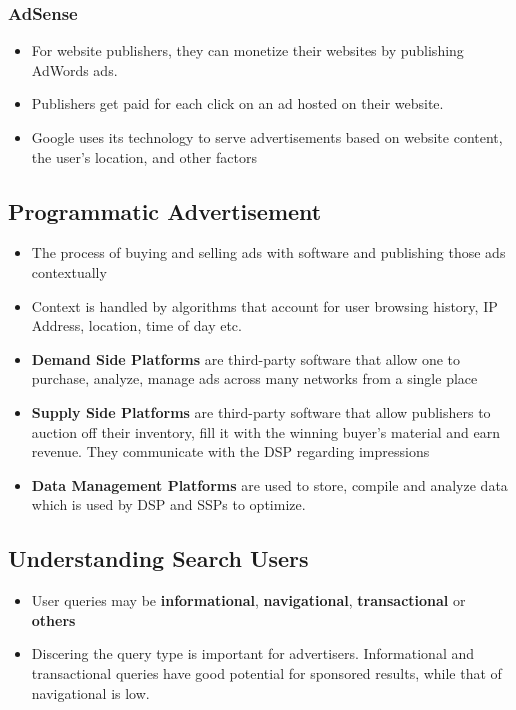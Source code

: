 \documentclass{article}
\begin{document}
\subsubsection{AdSense}
\begin{itemize}
    \item For website publishers, they can monetize their websites by publishing AdWords ads.
    
    \item Publishers get paid for each click on an ad hosted on their website.
    
    \item Google uses its technology to serve advertisements based on   website content, the user's location, and other factors
\end{itemize}

\subsection{Programmatic Advertisement}
\begin{itemize}
    \item The process of buying and selling ads with software and publishing those ads contextually
    
    \item Context is handled by algorithms that account for user browsing history, IP Address, location, time of day etc.
    
    \item \textbf{Demand Side Platforms} are third-party software that allow one to purchase, analyze, manage ads across many networks from a single place
    
    \item \textbf{Supply Side Platforms} are third-party software that allow publishers to auction off their inventory, fill it with the winning buyer's material and earn revenue. They communicate with the DSP regarding impressions
    
    \item \textbf{Data Management Platforms} are used to store, compile and analyze data which is used by DSP and SSPs to optimize. 
\end{itemize}

\subsection{Understanding Search Users}
\begin{itemize}
    \item User queries may be \textbf{informational}, \textbf{navigational}, \textbf{transactional} or \textbf{others}
    
    \item Discering the query type is important for advertisers. Informational and transactional queries have good potential for sponsored results, while that of navigational is low. 
\end{itemize}
\end{document}
